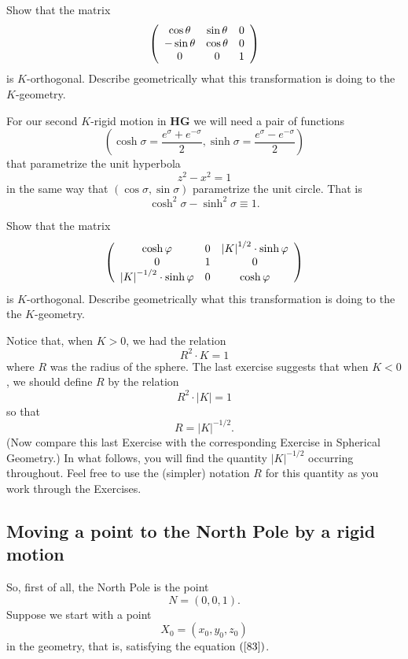 \documentclass{ximera}
\begin{document}
\begin{exercise}
 Show that the matrix%
\[
\left(
\begin{array}
[c]{ccc}%
\cos \theta & \sin \theta & 0\\
-\sin \theta & \cos \theta & 0\\
0 & 0 & 1
\end{array}
\right)
\]
is $K$-orthogonal. Describe geometrically what this transformation is doing to
the $K$-geometry.
\end{exercise}

For our second $K$-rigid motion in \textbf{HG} we will need a pair of
functions
\[
\left(  \cosh \sigma=\frac{e^{\sigma}+e^{-\sigma}}{2},\sinh %
\sigma=\frac{e^{\sigma}-e^{-\sigma}}{2}\right)
\]
that parametrize the unit hyperbola
\[
z^{2}-x^{2}=1
\]
in the same way that $\left(  \cos \sigma,\sin \sigma\right)  $
parametrize the unit circle. That is%
\[
\cosh ^{2}\sigma-\sinh ^{2}\sigma\equiv1.
\]


\begin{exercise}
 Show that the matrix%
\[
\left(
\begin{array}
[c]{ccc}%
\cosh \varphi & 0 & \left\vert K\right\vert ^{1/2}%
\cdot\sinh \varphi\\
0 & 1 & 0\\
\left\vert K\right\vert ^{-1/2}\cdot\sinh \varphi
& 0 & \cosh \varphi
\end{array}
\right)
\]
is $K$-orthogonal. Describe geometrically what this transformation is doing to
the the $K$-geometry.
\end{exercise}

Notice that, when $K>0$, we had the relation%
\[
R^{2}\cdot K=1
\]
where $R$ was the radius of the sphere. The last exercise suggests that when
$K<0$, we should define $R$ by the relation%
\[
R^{2}\cdot\left\vert K\right\vert =1
\]
so that%
\[
R=\left\vert K\right\vert ^{-1/2}.
\]
(Now compare this last Exercise with the corresponding Exercise in Spherical
Geometry.) In what follows, you will find the quantity $\left\vert
K\right\vert ^{-1/2}$ occurring throughout. Feel free to use the (simpler)
notation $R$ for this quantity as you work through the Exercises.

\subsection*{Moving a point to the North Pole by a rigid motion}

So, first of all, the North Pole is the point%
\[
N=\left(  0,0,1\right)  .
\]
Suppose we start with a point%
\[
X_{0}=\left(  x_{0},y_{0},z_{0}\right)
\]
in the geometry, that is, satisfying the equation $\left(  \ref{83}\right)  $.
\end{document}

